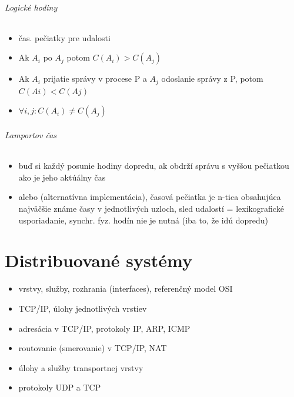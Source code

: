 \documentclass[a4paper]{report}
\begin{document}
\subparagraph{Logické hodiny}
\begin{itemize}
 \item čas. pečiatky pre udalosti
 \item Ak $A_i$ po $A_j$ potom $C(A_i) > C(A_j)$
 \item Ak $A_i$ prijatie správy v procese P a $A_j$ odoslanie správy z P, potom $C(Ai) < C(Aj)$
 \item $\forall i,j: C(A_i) \neq C(A_j)$
\end{itemize}

\subparagraph{Lamportov čas}
\begin{itemize}
 \item buď si každý posunie hodiny dopredu, ak obdrží správu s vyššou pečiatkou ako je jeho aktúálny čas
 \item alebo (alternatívna implementácia), časová pečiatka je n-tica obsahujúca najväčšie známe časy v jednotlivých uzloch, sled udalostí = lexikografické usporiadanie, synchr. fyz. hodín nie je nutná (iba to, že idú dopredu)
\end{itemize}

\chapter{Distribuované systémy}

\begin{zadanie}
\begin{itemize}
 \item vrstvy, služby, rozhrania (interfaces), referenčný model OSI
 \item TCP/IP, úlohy jednotlivých vrstiev
\end{itemize}
\end{zadanie}

\begin{zadanie}
\begin{itemize}
 \item adresácia v TCP/IP, protokoly IP, ARP, ICMP
 \item routovanie (smerovanie) v TCP/IP, NAT
\end{itemize}
\end{zadanie}

\begin{zadanie}
\begin{itemize}
 \item úlohy a služby transportnej vrstvy
 \item protokoly UDP a TCP
\end{itemize}
\end{zadanie}
\end{document}
